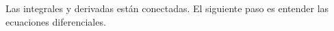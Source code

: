 \documentclass[preview]{standalone}
\begin{document}
\begin{center}
Las integrales y derivadas están conectadas. El siguiente paso es entender las ecuaciones diferenciales.
\end{center}
\end{document}
